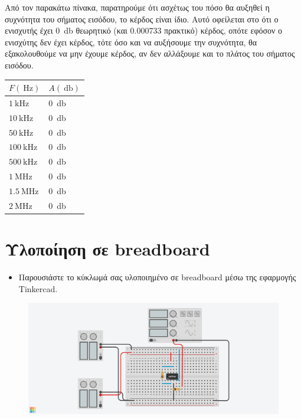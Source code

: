 \documentclass[12pt]{article}
\begin{document}
Από τον παρακάτω πίνακα, παρατηρούμε ότι ασχέτως του πόσο θα αυξηθεί η
συχνότητα του σήματος εισόδου, το κέρδος είναι ίδιο. Αυτό οφείλεται στο ότι ο
ενισχυτής έχει \SI{0}{\decibel} θεωρητικό (και 0.000733 πρακτικό) κέρδος, οπότε
εφόσον ο ενισχύτης δεν έχει κέρδος, τότε όσο και να αυξήσουμε την συχνότητα, θα
εξακολουθούμε να μην έχουμε κέρδος, αν δεν αλλάξουμε και το πλάτος του σήματος
εισόδου.

\begin{center}
\begin{tabular}{|l|l|}
	\hline
	$F(\SI{}{\hertz})$ & $A(\SI{}{\decibel})$ \\
	\hline
	$\SI{1}{\kilo\hertz}$ & \SI{0}{\decibel} \\
	\hline
	$\SI{10}{\kilo\hertz}$ & \SI{0}{\decibel} \\
	\hline
	$\SI{50}{\kilo\hertz}$ & \SI{0}{\decibel} \\
	\hline
	$\SI{100}{\kilo\hertz}$ & \SI{0}{\decibel} \\
	\hline
	$\SI{500}{\kilo\hertz}$ & \SI{0}{\decibel} \\
	\hline
	$\SI{1}{\mega\hertz}$ & \SI{0}{\decibel} \\
	\hline
	$\SI{1.5}{\mega\hertz}$ & \SI{0}{\decibel} \\
	\hline
	$\SI{2}{\mega\hertz}$ & \SI{0}{\decibel} \\
	\hline
\end{tabular}
\end{center}

\section{Υλοποίηση σε breadboard}

\begin{itemize}
	\item Παρουσιάστε το κύκλωμά σας υλοποιημένο σε breadboard μέσω
		της εφαρμογής Tinkercad.
\end{itemize}

\begin{figure}[H]
	\centering
	\includegraphics[width=\linewidth]{./res/bread.jpg}
\end{figure}
	
\renewcommand\refname{Βιβλιογραφία}
\printbibliography
\end{document}
